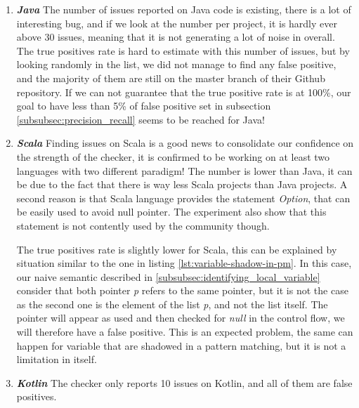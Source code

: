 \begin{enumerate}
	\item \textbf{\textit{Java}} \newline
	The number of issues reported on Java code is existing, there is a lot of interesting bug, and if we look at the number per project, it is hardly ever above 30 issues, meaning that it is not generating a lot of noise in overall.
	The true positives rate is hard to estimate with this number of issues, but by looking randomly in the list, we did not manage to find any false positive, and the majority of them are still on the master branch of their Github repository. 
	If we can not guarantee that the true positive rate is at 100\%, our goal to have less than 5\% of false positive set in subsection \ref{subsubsec:precision_recall} seems to be reached for Java!
    \newline
	\item \textbf{\textit{Scala}} \newline
	Finding issues on Scala is a good news to consolidate our confidence on the strength of the checker, it is confirmed to be working on at least two languages with two different paradigm!
	The number is lower than Java, it can be due to the fact that there is way less Scala projects than Java projects.
	A second reason is that Scala language provides the statement \emph{Option}, that can be easily used to avoid null pointer.
	The experiment also show that this statement is not contently used by the community though.
	
	
	
	The true positives rate is slightly lower for Scala, this can be explained by situation similar to the one in listing \ref{lst:variable-shadow-in-pm}. 
	In this case, our naive semantic described in \ref{subsubsec:identifying_local_variable} consider that both pointer \emph{p} refers to the same pointer, but it is not the case as the second one is the element of the list \emph{p}, and not the list itself.
	The pointer will appear as used and then checked for \emph{null} in the control flow, we will therefore have a false positive.
	This is an expected problem, the same can happen for variable that are shadowed in a pattern matching, but it is not a limitation in itself.
	
	\item \textbf{\textit{Kotlin}}
	The checker only reports 10 issues on Kotlin, and all of them are false positives.
	

\end{enumerate}
